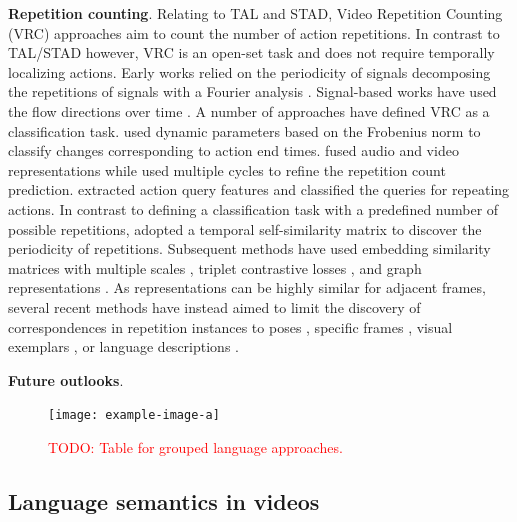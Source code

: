 \documentclass[smallextended,twocolumn,natbib]{svjour3}
\begin{document}
\noindent
\textbf{Repetition counting}. Relating to TAL and STAD, Video Repetition Counting (VRC) approaches aim to count the number of action repetitions. In contrast to TAL/STAD however, VRC is an open-set task and does not require temporally localizing actions. Early works relied on the periodicity of signals \citep{thangali2005periodic} decomposing the repetitions of signals with a Fourier analysis \citep{branzan2008generic,briassouli2007extraction,ousman2008segmentation,ross2000robust,pogalin2008visual}. Signal-based works have used the flow directions over time \citep{runia2018real}. A number of approaches have defined VRC as a classification task. \citet{lu2004repetitive} used dynamic parameters based on the Frobenius norm to classify changes corresponding to action end times.
\citet{zhang2021repetitive} fused audio and video representations while \citet{zhang2020context} used multiple cycles to refine the repetition count prediction. \citet{li2024efficient} extracted action query features and classified the queries for repeating actions. In contrast to defining a classification task with a predefined number of possible repetitions, \citet{dwibedi2020counting} adopted a temporal self-similarity matrix \citep{benabdelkader2004gait,junejo2010view,korner2013temporal} to discover the periodicity of repetitions. Subsequent methods have used embedding similarity matrices with multiple scales \citep{bacharidis2023repetition,hu2022transrac}, triplet contrastive losses \citep{destro2024cyclecl}, and graph representations \citep{panagiotakis2018unsupervised}. As representations can be highly similar for adjacent frames, several recent methods have instead aimed to limit the discovery of correspondences in repetition instances to poses \citep{ferreira2021deep,yao2023poserac}, specific frames \citep{li2024repetitive,zhao2024skim}, visual exemplars \citep{sinha2024every}, or language descriptions \citep{dwibedi2024ovr}.

\noindent
\textbf{Future outlooks}.



\begin{figure}[t]
    \centering
    \texttt{[image: example-image-a]}
    \caption{\textcolor{red}{TODO: Table for grouped language approaches.}}
\end{figure}


\subsection{Language semantics in videos}
\citep{song2024moviechat}
\citep{yu2017end}
\citep{anderson2018vision}
\end{document}
